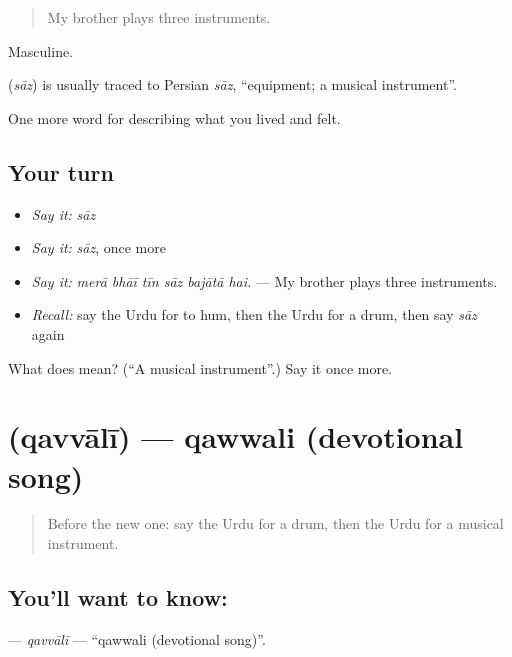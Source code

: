 \begin{quote}
My brother plays three instruments.
\end{quote}

Masculine.

\begin{cousinweb}
\textbf{} (\emph{sāz}) is usually traced to Persian \emph{sāz}, \textquotedblleft{}equipment; a musical instrument\textquotedblright{}.
\end{cousinweb}

\begin{grammarlens}[title={What you've built}]
One more word for describing what you lived and felt.
\end{grammarlens}

\subsection*{Your turn}
\begin{itemize}
\raggedright
  \item \emph{Say it:} \emph{sāz}
  \item \emph{Say it:} \emph{sāz}, once more
  \item \emph{Say it:} \emph{merā bhāī tīn sāz bajātā hai.} — My brother plays three instruments.
  \item \emph{Recall:} say the Urdu for to hum, then the Urdu for a drum, then say \emph{sāz} again
\end{itemize}

\begin{tcolorbox}[breakable,colback=teal!4,colframe=teal!35!black,title={Before you move on}]
What does  mean? (\textquotedblleft{}A musical instrument\textquotedblright{}.) Say it once more.
\end{tcolorbox}
\section[\texorpdfstring{\ur{قوالی} (qavvālī)}{قوالی (qavvālī)}]{ (qavvālī) — qawwali (devotional song)}

\label{lesson:UR-C519-qavvali}



\begin{quote}
Before the new one: say the Urdu for a drum, then the Urdu for a musical instrument.
\end{quote}

\subsection*{You'll want to know: }
\textbf{} — \emph{qavvālī} — \textquotedblleft{}qawwali (devotional song)\textquotedblright{}.

